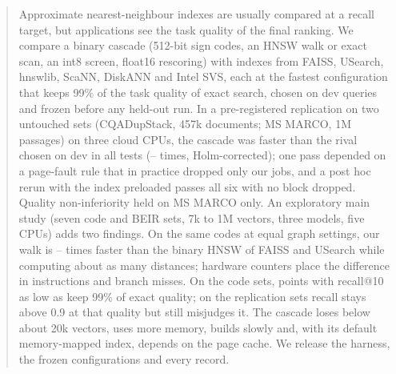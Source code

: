 \begin{abstract}
Approximate nearest-neighbour indexes are usually compared at a recall target, but applications see the task quality of
the final ranking. We compare a binary cascade (512-bit sign codes, an HNSW walk or exact scan, an int8 screen, float16
rescoring) with indexes from FAISS, USearch, hnswlib, ScaNN, DiskANN and Intel SVS, each at the fastest configuration
that keeps 99\% of the task quality of exact search, chosen on dev queries and frozen before any held-out run. In a
pre-registered replication on two untouched sets (CQADupStack, 457k documents; MS MARCO, 1M passages) on three cloud
CPUs, the cascade was faster than the rival chosen on dev in all  tests (-- times,
Holm-corrected); one pass depended on a page-fault rule that in practice dropped only our jobs, and a post hoc rerun with
the index preloaded passes all six with no block dropped. Quality non-inferiority held on MS MARCO only. An exploratory
main study (seven code and BEIR sets, 7k to 1M vectors, three models, five CPUs) adds two findings. On the same codes at
equal graph settings, our walk is -- times faster than the binary HNSW of FAISS and
USearch while computing about as many distances; hardware counters place the difference in instructions and branch
misses. On the code sets, points with recall@10 as low as  keep 99\% of exact quality; on the replication
sets recall stays above 0.9 at that quality but still misjudges it. The cascade loses below about 20k vectors, uses more
memory, builds slowly and, with its default memory-mapped index, depends on the page cache. We release the harness, the
frozen configurations and every record.
\end{abstract}

